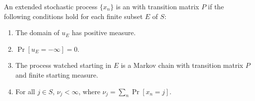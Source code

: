 An extended stochastic process $\{x_n\}$ is an  with transition matrix $P$ if the following conditions hold for each finite subset $E$ of $S$:
\begin{enumerate}
\item The domain of $u_E$ has positive measure.
\item $\Pr[u_E = -\infty] = 0$.
\item The process watched starting in $E$ is a Markov chain with transition matrix $P$ and finite starting measure.
\item For all $j \in S$, $\nu_j < \infty$, where $\nu_j = \sum_n \Pr[x_n = j]$.
\end{enumerate}
